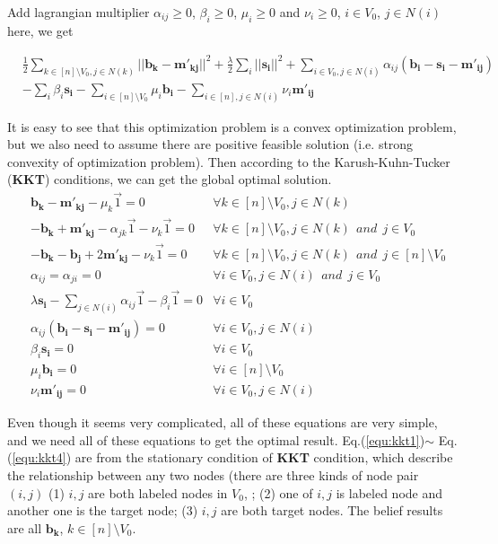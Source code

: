 Add lagrangian multiplier $\alpha_{ij} \geq 0$, $\beta_i \geq 0$, $\mu_i \geq 0$ and $\nu_i\geq 0$, $i\in V_0$, $j\in N(i)$  here, we get

\begin{align*}
&\frac{1}{2}\mathop{\sum}_{k \in [n]\setminus V_0, j\in N(k)}||\mathbf{b_k} - \mathbf{m'_{kj}}||^2 + \frac{\lambda}{2}\sum_i||\mathbf{s_i}||^2 + \mathop{\sum}_{i\in V_0,j\in N(i)}\alpha_{ij}(\mathbf{b_i}
-\mathbf{s_i} -  \mathbf{m'_{ij}}) \\&- \sum_i \beta_{i}\mathbf{s_i} - \sum_{i\in [n]\setminus V_0} \mu_{i}\mathbf{b_i} - \sum_{i\in [n], j\in N(i)} \nu_{i}\mathbf{m'_{ij}}
\end{align*}



It is easy to see that this optimization problem is a convex optimization problem, but we also need to assume there are positive feasible solution (i.e. strong convexity of optimization problem). Then according to the Karush-Kuhn-Tucker (\textbf{KKT}) conditions, we can get the global optimal solution.
\begin{align}
\label{equ:kkt1}
&\mathbf{b_k} - \mathbf{m'_{kj}} - \mu_k\vec{1} = 0 ~~~~&\forall k\in [n]\setminus V_0, j\in N(k)\\
\label{equ:kkt2}
&- \mathbf{b_k} + \mathbf{m'_{kj}} - \alpha_{jk}\vec{1} - \nu_{k}\vec{1} = 0 &\forall k\in [n]\setminus V_0, j\in N(k)~~and~~j\in V_0\\
\label{equ:kkt3}
&- \mathbf{b_k} - \mathbf{b_j} + 2\mathbf{m'_{kj}} - \nu_{k}\vec{1} = 0 &\forall k\in [n]\setminus V_0, j\in N(k)~~and~~j\in [n]\setminus V_0\\
\label{equ:kkt4}
& \alpha_{ij} = \alpha_{ji} = 0 &\forall i\in V_0, j\in N(i)~~and~~j\in V_0\\
\label{equ:kkt5}
&\lambda \mathbf{s_i} - \sum_{j\in N(i)}\alpha_{ij}\vec{1} - \beta_i \vec{1}=0 &\forall i\in V_0\\
\label{equ:kkt6}
&\alpha_{ij}(\mathbf{b_i}-\mathbf{s_i}- \mathbf{m'_{ij}}) = 0 &\forall i\in V_0, j\in N(i)\\
\label{equ:kkt7}
&\beta_i \mathbf{s_i} = 0 &\forall i\in V_0\\
\label{equ:kkt8}
&\mu_i \mathbf{b_i} = 0 &\forall i\in [n]\setminus V_0\\
\label{equ:kkt9}
&\nu_i \mathbf{m'_{ij}} = 0 &\forall i\in V_0, j\in N(i)
\end{align}

Even though it seems very complicated, all of these equations are very simple, and we need all of these equations to get the optimal result.  Eq.(\ref{equ:kkt1})$\sim$ Eq.(\ref{equ:kkt4}) are from the stationary condition of \textbf{KKT} condition, which describe the relationship between any two nodes (there are three kinds of node pair $(i,j)$ (1) $i,j$ are both labeled nodes in $V_0$, ; (2) one of $i,j$ is labeled node and another one is the target node; (3) $i,j$ are both target nodes. The belief results are all $\mathbf{b_k}$, $k\in [n]\setminus V_0$.

